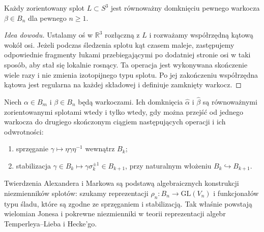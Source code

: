\begin{twierdzenie}[Alexander]
Każdy zorientowany splot $L\subset S^3$ jest równoważny
domknięciu pewnego warkocza $\beta\in B_n$ dla pewnego $n\geq1$.
\end{twierdzenie}

\begin{proof}[Idea dowodu]
Ustalamy oś w $\mathbb R^3$ rozłączną z $L$ i rozważamy
współrzędną kątową wokół osi. Jeżeli podczas śledzenia splotu
kąt czasem maleje, zastępujemy odpowiednie fragmenty łukami
przebiegającymi po dodatniej stronie osi w taki sposób,
aby stał się lokalnie rosnący. Ta operacja jest wykonywana
skończenie wiele razy i nie zmienia izotopijnego typu splotu.
Po jej zakończeniu współrzędna kątowa jest regularna
na każdej składowej i definiuje zamknięty warkocz.
\end{proof}

\begin{twierdzenie}[Markow]
Niech $\alpha\in B_m$ i $\beta\in B_n$ będą warkoczami.
Ich domknięcia $\widehat\alpha$ i $\widehat\beta$ są
równoważnymi zorientowanymi splotami wtedy i tylko wtedy,
gdy można przejść od jednego warkocza do drugiego skończonym
ciągiem następujących operacji i ich odwrotności:
\begin{enumerate}[label=(\roman*)]
\item sprzęganie $\gamma\mapsto\eta\gamma\eta^{-1}$ wewnątrz $B_k$;
\item stabilizacja $\gamma\in B_k\mapsto\gamma\sigma_k^{\pm1}
\in B_{k+1}$, przy naturalnym włożeniu $B_k\hookrightarrow B_{k+1}$.
\end{enumerate}
\end{twierdzenie}

\begin{uwaga}
Twierdzenia Alexandera i Markowa są podstawą algebraicznych
konstrukcji niezmienników splotów: szukamy reprezentacji
$\rho_n\colon B_n\to\mathrm{GL}(V_n)$ i funkcjonałów typu
śladu, które są zgodne ze sprzęganiem i stabilizacją.
Tak właśnie powstają wielomian Jonesa i pokrewne niezmienniki
w teorii reprezentacji algebr Temperleya--Lieba i Hecke'go.
\end{uwaga}

